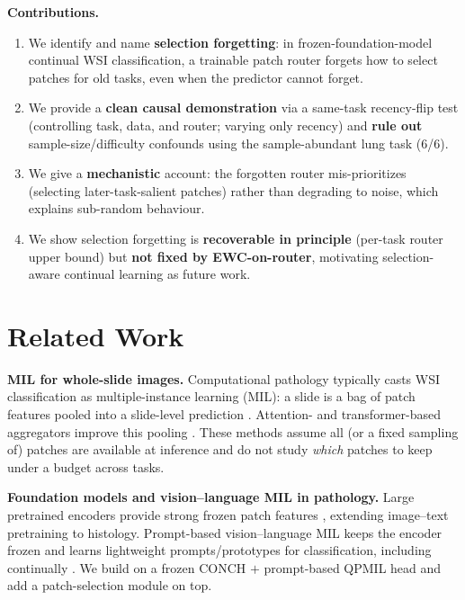 \noindent\textbf{Contributions.}
\begin{enumerate}
\item We identify and name \textbf{selection forgetting}: in
frozen-foundation-model continual WSI classification, a trainable patch router
forgets how to select patches for old tasks, even when the predictor cannot
forget.
\item We provide a \textbf{clean causal demonstration} via a same-task
recency-flip test (controlling task, data, and router; varying only recency)
and \textbf{rule out} sample-size/difficulty confounds using the
sample-abundant lung task (6/6).
\item We give a \textbf{mechanistic} account: the forgotten router
mis-prioritizes (selecting later-task-salient patches) rather than degrading to
noise, which explains sub-random behaviour.
\item We show selection forgetting is \textbf{recoverable in principle}
(per-task router upper bound) but \textbf{not fixed by EWC-on-router},
motivating selection-aware continual learning as future work.
\end{enumerate}

\section{Related Work}
\label{sec:related}

\noindent\textbf{MIL for whole-slide images.} Computational pathology
typically casts WSI classification as multiple-instance learning (MIL): a slide
is a bag of patch features pooled into a slide-level prediction
\cite{ilse2018abmil}. Attention- and transformer-based aggregators improve this
pooling \cite{lu2021clam,shao2021transmil,li2021dsmil}. These methods assume
all (or a fixed sampling of) patches are available at inference and do not study
\emph{which} patches to keep under a budget across tasks.

\noindent\textbf{Foundation models and vision--language MIL in pathology.}
Large pretrained encoders provide strong frozen patch features
\cite{chen2024uni,lu2024conch,huang2023plip}, extending image--text pretraining
\cite{radford2021clip} to histology. Prompt-based vision--language MIL keeps the
encoder frozen and learns lightweight prompts/prototypes for classification,
including continually \cite{gou2025qpmil}. We build on a frozen CONCH $+$
prompt-based QPMIL head and add a patch-selection module on top.

